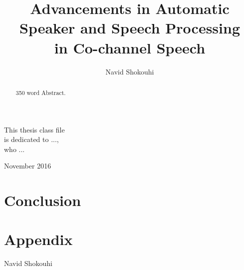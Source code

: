 \documentclass[doublespacing]{utdthesis}
\author{Navid Shokouhi}
\title{Advancements in Automatic \\Speaker and Speech Processing \\in Co-channel Speech}
\begin{document}
\frontmatter

\signaturepage

\begin{dedication} %
This thesis class file \\
is dedicated to ..., \\
who ...
\end{dedication}

\maketitle

\begin{acks}{November 2016} %


\end{acks}

\begin{preface} %
\end{preface}

\begin{abstract}
350 word Abstract.

\end{abstract}

\tableofcontents
\listoffigures %
\listoftables %

\mainmatter











\chapter{Conclusion}
\label{c:conclude}



\chapter*{Appendix}
\label{a:other}

\begin{thesisbib}
\end{thesisbib}  %

\begin{vita}
Navid Shokouhi
\end{vita}
\end{document}
